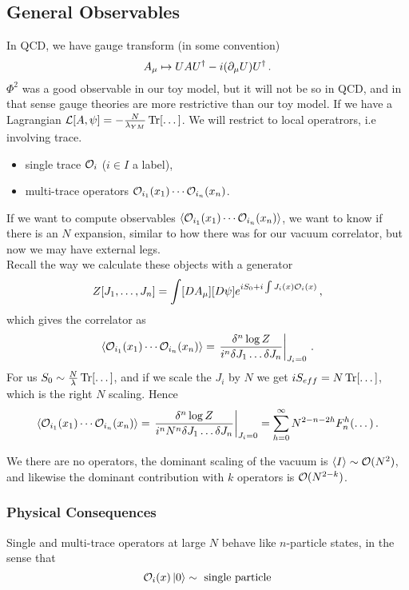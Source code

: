 \documentclass{article}
\begin{document}
\subsection{General Observables}
In QCD, we have gauge transform (in some convention)
\[
A_\mu \mapsto UAU^\dagger -i(\partial_\mu U)U^\dagger \, .
\]
$\Phi^2$ was a good observable in our toy model, but it will not be so in QCD, and in that sense gauge theories are more restrictive than our toy model. If we have a Lagrangian $\mathcal{L}[A, \psi] = -\frac{N}{\lambda_{YM}} \operatorname{Tr}[\dots]$. We will restrict to local operatrors, i.e involving trace. 
\begin{itemize}
	\item single trace $\mathcal{O}_i$ ($i \in I$ a label), 
	\item multi-trace operators $\mathcal{O}_{i_1}(x_1) \cdots \mathcal{O}_{i_n}(x_n)$. 
\end{itemize}
If we want to compute observables $\left\langle \mathcal{O}_{i_1}(x_1) \cdots \mathcal{O}_{i_n}(x_n) \right\rangle$, we want to know if there is an $N$ expansion, similar to how there was for our vacuum correlator, but now we may have external legs. \\
Recall the way we calculate these objects with a generator 
\[
Z[J_1, \dots, J_n] = \int [DA_\mu] [D\psi] e^{i S_0 + i \int J_i(x) \mathcal{O}_i(x)} \, ,
\]
which gives the correlator as 
\[
\left\langle \mathcal{O}_{i_1}(x_1) \cdots \mathcal{O}_{i_n}(x_n) \right\rangle = \left. \frac{\delta^n \log Z}{i^n \delta J_1 \dots \delta J_n} \right\rvert_{J_i = 0} \, .
\]
For us $S_0 \sim \frac{N}{\lambda} \operatorname{Tr}[\dots]$, and if we scale the $J_i$ by $N$ we get $iS_{eff} = N \operatorname{Tr}[\dots]$, which is the right $N$ scaling. Hence 
\[
\left\langle \mathcal{O}_{i_1}(x_1) \cdots \mathcal{O}_{i_n}(x_n) \right\rangle = \left. \frac{\delta^n \log Z}{i^n N^n \delta J_1 \dots \delta J_n} \right\rvert_{J_i = 0} = \sum_{h=0}^\infty N^{2-n-2h} F_n^h(\dots) \, . 
\]
\begin{remark}
	We there are no operators, the dominant scaling of the vacuum is $\left\langle I \right\rangle \sim \mathcal{O}(N^2)$, and likewise the dominant contribution with $k$ operators is $\mathcal{O}(N^{2-k})$.  
\end{remark}

\subsubsection{Physical Consequences}
\begin{remark}
	Single and multi-trace operators at large $N$ behave like $n$-particle states, in the sense that 
	\[
	\mathcal{O}_i(x)\ket{0} \sim \text{ single particle}
	\]
\end{remark}




\end{document}
